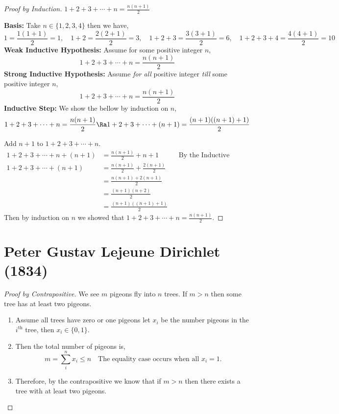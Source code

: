 \documentclass{homework}
\begin{document}
\begin{proof}[Proof by Induction] $1+2+3+\cdots+n=\frac{n(n+1)}{2}$

    \textbf{Basis:} Take $n\in\{1,2,3,4\}$ then we have,
    \[
        1       =\frac{1(1+1)}{2}=1  ,\quad
        1+2     =\frac{2(2+1)}{2}=3  ,\quad
        1+2+3   =\frac{3(3+1)}{2}=6  ,\quad
        1+2+3+4 =\frac{4(4+1)}{2}=10
    \]
    \textbf{Weak Inductive Hypothesis:} Assume for some positive integer $n$,
    \[
        1+2+3+\cdots+n=\frac{n(n+1)}{2}
    \]
    \textbf{Strong Inductive Hypothesis:} Assume \textit{for all} positive integer \textit{till} some positive integer $n$,
    \[
        1+2+3+\cdots+n=\frac{n(n+1)}{2}
    \]
    \textbf{Inductive Step:} We show the bellow by induction on $n$,
    \[
        1+2+3+\cdots+n=\frac{n(n+1)}{2} \Ra 1+2+3+\cdots+(n+1)=\frac{(n+1)((n+1)+1)}{2}
    \]

    Add $n+1$ to $1+2+3+\cdots+n$.
    \begin{align*}
        1+2+3+\cdots+n+(n+1) & = \frac{n(n+1)}{2}+n+1              &  & \text{By the Inductive Hypothesis.} \\
        1+2+3+\cdots+(n+1)   & = \frac{n(n+1)}{2}+\frac{2(n+1)}{2}                                          \\
                             & = \frac{n(n+1)+2(n+1)}{2}                                                    \\
                             & = \frac{(n+1)(n+2)}{2}                                                       \\
                             & = \frac{(n+1)((n+1)+1)}{2}
    \end{align*}
    Then by induction on $n$ we showed that $1+2+3+\cdots+n=\frac{n(n+1)}{2}$.
\end{proof}

\section{Peter Gustav Lejeune Dirichlet (1834)}

\begin{proof}[Proof by Contrapositive] We see $m$ pigeons fly into $n$ trees. If $m>n$ then some tree has at least two pigeons.
    \begin{enumerate}
        \item Assume all trees have zero or one pigeons \ie let $x_i$ be the number pigeons in the $i^{\text{th}}$ tree, then $x_i\in\{0,1\}$.
        \item Then the total number of pigeons is,
              \[
                  m = \sum_i^nx_i \leq n\quad\text{The equality case occurs when all }x_i=1.
              \]
        \item Therefore, by the contrapositive we know that if $m>n$ then there exists a tree with at least two pigeons. \qedhere
    \end{enumerate}
\end{proof}
\end{document}
